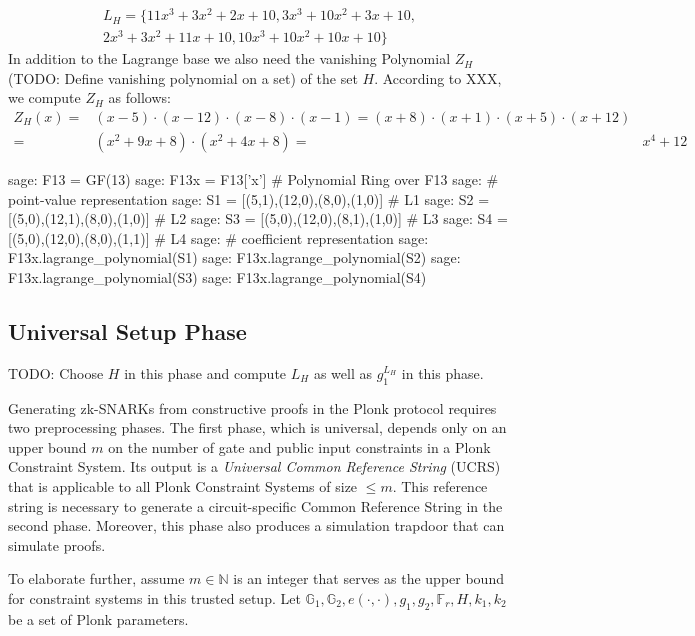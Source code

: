 \begin{example}
\begin{multline}
\label{ex:lagrange-base-H}
L_H = \{ 11x^3 +3x^2 +2x + 10, 3x^3 +10x^2+ 3x + 10, \\ 2x^3 + 3x^2 +11x +10, 10x^3 + 10 x^2 +10x + 10\}
\end{multline}
In addition to the Lagrange base we also need the vanishing Polynomial $Z_H$ (TODO: Define vanishing polynomial on a set) of the set $H$. According to XXX, we compute $Z_H$ as follows:
\begin{align*}
Z_H(x) = & (x-5)\cdot(x-12)\cdot(x-8)\cdot(x-1) = (x+8)\cdot(x+1)\cdot(x+5)\cdot(x+12) \\
       = & (x^2 + 9x +8) \cdot (x^2 + 4x +8)
       = & x^4 +12
\end{align*}

\begin{sagecommandline}
sage: F13 = GF(13)
sage: F13x = F13['x'] # Polynomial Ring over F13
sage: # point-value representation
sage: S1 = [(5,1),(12,0),(8,0),(1,0)] # L1
sage: S2 = [(5,0),(12,1),(8,0),(1,0)] # L2
sage: S3 = [(5,0),(12,0),(8,1),(1,0)] # L3
sage: S4 = [(5,0),(12,0),(8,0),(1,1)] # L4
sage: # coefficient representation
sage: F13x.lagrange_polynomial(S1)
sage: F13x.lagrange_polynomial(S2)
sage: F13x.lagrange_polynomial(S3)
sage: F13x.lagrange_polynomial(S4)
\end{sagecommandline}
\end{example}


\subsection{Universal Setup Phase}
TODO: Choose $H$ in this phase and compute $L_H$ as well as $g_1^{L_H}$ in this phase.


Generating zk-SNARKs from constructive proofs in the Plonk protocol requires two preprocessing phases. The first phase, which is universal, depends only on an upper bound $m$ on the number of gate and public input constraints in a Plonk Constraint System. Its output is a \textit{Universal Common Reference String} (UCRS) that is applicable to all Plonk Constraint Systems of size $\leq m$. This reference string is necessary to generate a circuit-specific Common Reference String in the second phase. Moreover, this phase also produces a simulation trapdoor that can simulate proofs.

To elaborate further, assume $m \in \mathbb{N}$ is an integer that serves as the upper bound for constraint systems in this trusted setup. Let ${\mathbb{G}_1, \mathbb{G}_2, e(\cdot,\cdot), g_1, g_2, \mathbb{F}_r, H, k_1,k_2}$ be a set of Plonk parameters.

